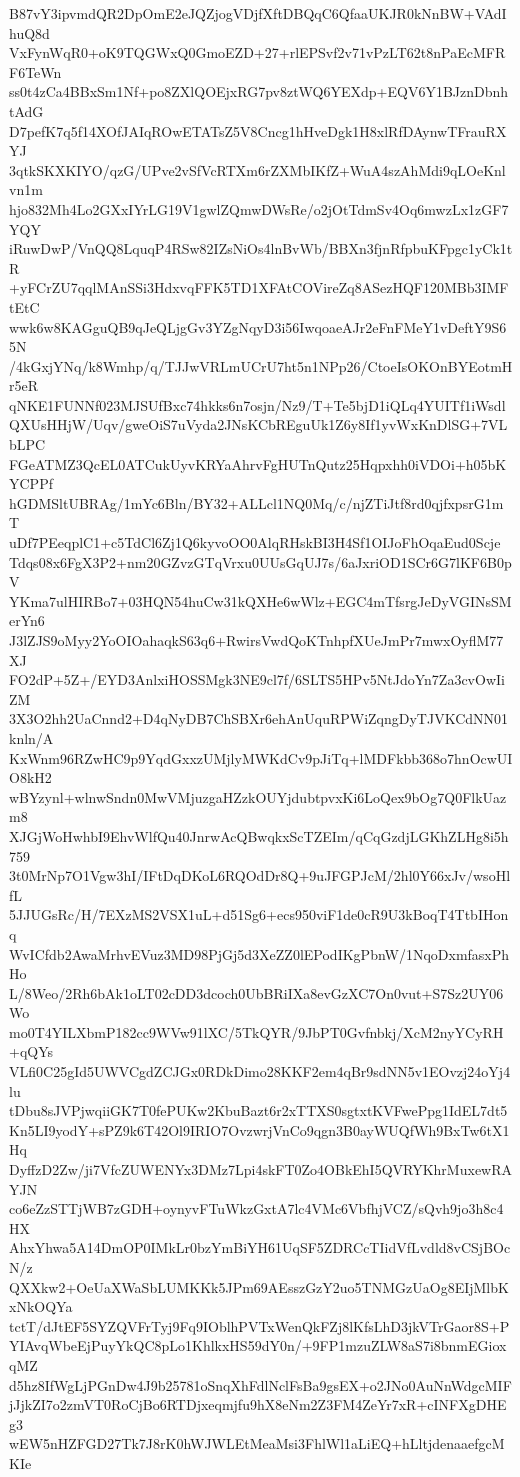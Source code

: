 B87vY3ipvmdQR2DpOmE2eJQZjogVDjfXftDBQqC6QfaaUKJR0kNnBW+VAdIhuQ8d
VxFynWqR0+oK9TQGWxQ0GmoEZD+27+rlEPSvf2v71vPzLT62t8nPaEcMFRF6TeWn
ss0t4zCa4BBxSm1Nf+po8ZXlQOEjxRG7pv8ztWQ6YEXdp+EQV6Y1BJznDbnhtAdG
D7pefK7q5f14XOfJAIqROwETATsZ5V8Cncg1hHveDgk1H8xlRfDAynwTFrauRXYJ
3qtkSKXKIYO/qzG/UPve2vSfVcRTXm6rZXMbIKfZ+WuA4szAhMdi9qLOeKnlvn1m
hjo832Mh4Lo2GXxIYrLG19V1gwlZQmwDWsRe/o2jOtTdmSv4Oq6mwzLx1zGF7YQY
iRuwDwP/VnQQ8LquqP4RSw82IZsNiOs4lnBvWb/BBXn3fjnRfpbuKFpgc1yCk1tR
+yFCrZU7qqlMAnSSi3HdxvqFFK5TD1XFAtCOVireZq8ASezHQF120MBb3IMFtEtC
wwk6w8KAGguQB9qJeQLjgGv3YZgNqyD3i56IwqoaeAJr2eFnFMeY1vDeftY9S65N
/4kGxjYNq/k8Wmhp/q/TJJwVRLmUCrU7ht5n1NPp26/CtoeIsOKOnBYEotmHr5eR
qNKE1FUNNf023MJSUfBxc74hkks6n7osjn/Nz9/T+Te5bjD1iQLq4YUITf1iWsdl
QXUsHHjW/Uqv/gweOiS7uVyda2JNsKCbREguUk1Z6y8If1yvWxKnDlSG+7VLbLPC
FGeATMZ3QcEL0ATCukUyvKRYaAhrvFgHUTnQutz25Hqpxhh0iVDOi+h05bKYCPPf
hGDMSltUBRAg/1mYc6Bln/BY32+ALLcl1NQ0Mq/c/njZTiJtf8rd0qjfxpsrG1mT
uDf7PEeqplC1+c5TdCl6Zj1Q6kyvoOO0AlqRHskBI3H4Sf1OIJoFhOqaEud0Scje
Tdqs08x6FgX3P2+nm20GZvzGTqVrxu0UUsGqUJ7s/6aJxriOD1SCr6G7lKF6B0pV
YKma7ulHIRBo7+03HQN54huCw31kQXHe6wWlz+EGC4mTfsrgJeDyVGINsSMerYn6
J3lZJS9oMyy2YoOIOahaqkS63q6+RwirsVwdQoKTnhpfXUeJmPr7mwxOyflM77XJ
FO2dP+5Z+/EYD3AnlxiHOSSMgk3NE9cl7f/6SLTS5HPv5NtJdoYn7Za3cvOwIiZM
3X3O2hh2UaCnnd2+D4qNyDB7ChSBXr6ehAnUquRPWiZqngDyTJVKCdNN01knln/A
KxWnm96RZwHC9p9YqdGxxzUMjlyMWKdCv9pJiTq+lMDFkbb368o7hnOcwUIO8kH2
wBYzynl+wlnwSndn0MwVMjuzgaHZzkOUYjdubtpvxKi6LoQex9bOg7Q0FlkUazm8
XJGjWoHwhbI9EhvWlfQu40JnrwAcQBwqkxScTZEIm/qCqGzdjLGKhZLHg8i5h759
3t0MrNp7O1Vgw3hI/IFtDqDKoL6RQOdDr8Q+9uJFGPJcM/2hl0Y66xJv/wsoHlfL
5JJUGsRc/H/7EXzMS2VSX1uL+d51Sg6+ecs950viF1de0cR9U3kBoqT4TtbIHonq
WvICfdb2AwaMrhvEVuz3MD98PjGj5d3XeZZ0lEPodIKgPbnW/1NqoDxmfasxPhHo
L/8Weo/2Rh6bAk1oLT02cDD3dcoch0UbBRiIXa8evGzXC7On0vut+S7Sz2UY06Wo
mo0T4YILXbmP182cc9WVw91lXC/5TkQYR/9JbPT0Gvfnbkj/XcM2nyYCyRH+qQYs
VLfi0C25gId5UWVCgdZCJGx0RDkDimo28KKF2em4qBr9sdNN5v1EOvzj24oYj4lu
tDbu8sJVPjwqiiGK7T0fePUKw2KbuBazt6r2xTTXS0sgtxtKVFwePpg1IdEL7dt5
Kn5LI9yodY+sPZ9k6T42Ol9IRIO7OvzwrjVnCo9qgn3B0ayWUQfWh9BxTw6tX1Hq
DyffzD2Zw/ji7VfcZUWENYx3DMz7Lpi4skFT0Zo4OBkEhI5QVRYKhrMuxewRAYJN
co6eZzSTTjWB7zGDH+oynyvFTuWkzGxtA7lc4VMc6VbfhjVCZ/sQvh9jo3h8c4HX
AhxYhwa5A14DmOP0IMkLr0bzYmBiYH61UqSF5ZDRCcTIidVfLvdld8vCSjBOcN/z
QXXkw2+OeUaXWaSbLUMKKk5JPm69AEsszGzY2uo5TNMGzUaOg8EIjMlbKxNkOQYa
tctT/dJtEF5SYZQVFrTyj9Fq9IOblhPVTxWenQkFZj8lKfsLhD3jkVTrGaor8S+P
YIAvqWbeEjPuyYkQC8pLo1KhlkxHS59dY0n/+9FP1mzuZLW8aS7i8bnmEGioxqMZ
d5hz8IfWgLjPGnDw4J9b25781oSnqXhFdlNclFsBa9gsEX+o2JNo0AuNnWdgcMIF
jJjkZI7o2zmVT0RoCjBo6RTDjxeqmjfu9hX8eNm2Z3FM4ZeYr7xR+cINFXgDHEg3
wEW5nHZFGD27Tk7J8rK0hWJWLEtMeaMsi3FhlWl1aLiEQ+hLltjdenaaefgcMKIe
